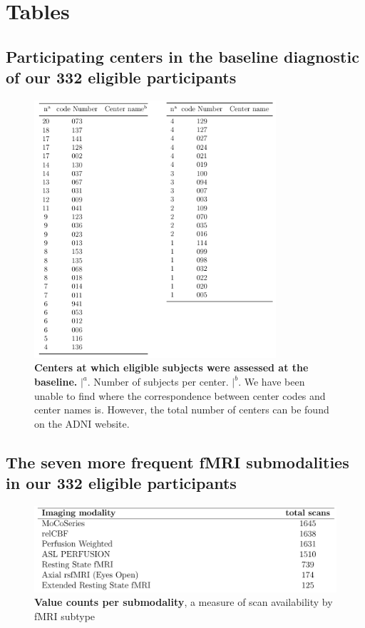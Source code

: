 \clearpage
\section{Tables} 



	\subsection{Participating centers in the baseline diagnostic of our 332 eligible participants} \label{taula_centres_metode}
	
	
	\begin{figure}[h]
		\centering
		\includegraphics[width=0.80\textwidth]{tauladelscollons.png}
		\caption{\textbf{Centers at which eligible subjects were assessed at the baseline.} $| ^{a}.$ Number of subjects per center. $| ^{b}.$ We have been unable to find where the correspondence between center codes and center names is. However, the total number of centers can be found on the ADNI website.}
		\label{fig:tauladelscollons}
	\end{figure}
	\clearpage
	
	\subsection{The seven more frequent fMRI submodalities in our 332 eligible participants} \label{taula_submodalitats_fmri} 


		\begin{figure}[h]
			\centering
			\includegraphics[width=1\textwidth]{fig_submodalitats_fmri_mesfrequents.png}
			\caption{\textbf{Value counts per submodality}, a measure of scan availability by fMRI subtype}
			\label{fig:submodalitats_fmri_mesfrequents}
		\end{figure}


